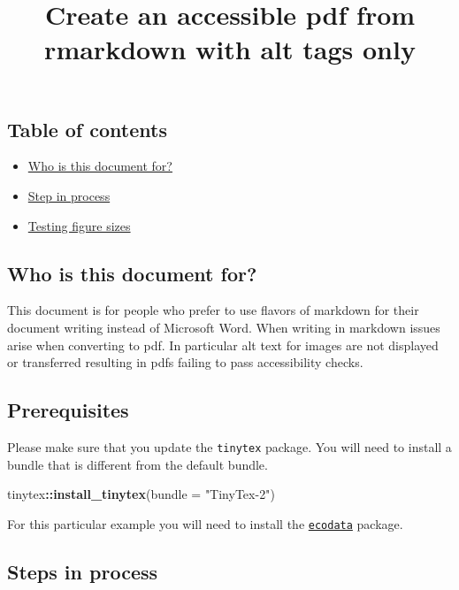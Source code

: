 \documentclass[
]{article}
\title{Create an accessible pdf from rmarkdown with alt tags only}
\author{}
\date{\vspace{-2.5em}}
\newenvironment{Shaded}{\begin{snugshade}}{\end{snugshade}}
\newcommand{\AttributeTok}[1]{\textcolor[rgb]{0.13,0.29,0.53}{#1}}
\newcommand{\FunctionTok}[1]{\textcolor[rgb]{0.13,0.29,0.53}{\textbf{#1}}}
\newcommand{\NormalTok}[1]{#1}
\newcommand{\SpecialCharTok}[1]{\textcolor[rgb]{0.81,0.36,0.00}{\textbf{#1}}}
\newcommand{\StringTok}[1]{\textcolor[rgb]{0.31,0.60,0.02}{#1}}
\providecommand{\tightlist}{%
  \setlength{\itemsep}{0pt}\setlength{\parskip}{0pt}}
\begin{document}
\maketitle

\subsection{Table of contents}\label{table-of-contents}

\begin{itemize}
\tightlist
\item
  \hyperref[who-is-this-document-for]{Who is this document for?}
\item
  \hyperref[steps-in-process]{Step in process}
\item
  \hyperref[testing-figure-sizes]{Testing figure sizes}
\end{itemize}

\subsection{Who is this document for?}\label{who-is-this-document-for}

This document is for people who prefer to use flavors of markdown for
their document writing instead of Microsoft Word. When writing in
markdown issues arise when converting to pdf. In particular alt text for
images are not displayed or transferred resulting in pdfs failing to
pass accessibility checks.

\subsection{Prerequisites}\label{prerequisites}

Please make sure that you update the \texttt{tinytex} package. You will
need to install a bundle that is different from the default bundle.

\begin{Shaded}
\begin{Highlighting}[]
\NormalTok{tinytex}\SpecialCharTok{::}\FunctionTok{install\_tinytex}\NormalTok{(}\AttributeTok{bundle =} \StringTok{"TinyTex{-}2"}\NormalTok{)}
\end{Highlighting}
\end{Shaded}

For this particular example you will need to install the
\href{https://github.com/NOAA-EDAB/ecodata}{\texttt{ecodata}} package.

\subsection{Steps in process}\label{steps-in-process}
\end{document}
